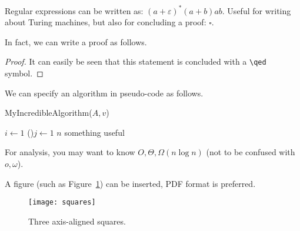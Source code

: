 \documentclass[
  course = {{IE579 Game Theory and Multi-Agent Reinforcement Learning}},
  assignment = 1,
  name = {{Mohammad Mahdi Rahimi}},
  studentnumber = {{20208244}},
  email = {{mahi@kaist.ac.kr}},
  firstexercise = 1
]{aga-homework}
\begin{document}
\exercise

\subexercise Regular expressions can be written as: $(a + \varepsilon)^* (a+b) ab$.
\subexercise Useful for writing about Turing machines, but also for concluding a proof: $\square$.

In fact, we can write a proof as follows.

\begin{proof}
  It can easily be seen that this statement is concluded with a \texttt{\textbackslash{}qed} symbol.
\end{proof}


\exercise

We can specify an algorithm in pseudo-code as follows.

\begin{algorithm}[H]
  \caption{MyIncredibleAlgorithm($A, v$)}

  $i \leftarrow 1$ \;
  \For(){$j \leftarrow 1$ \To $n$}{
    something useful 
  }
\end{algorithm}

\noindent For analysis, you may want to know $O, \Theta, \Omega(n \log n)$ (not to be confused with $o, \omega$).


\exercise

A figure (such as Figure~\ref{fig:squares}) can be inserted, PDF format is preferred.

\begin{figure}[b] %
  \begin{center}
    \texttt{[image: squares]}
    \caption{Three axis-aligned squares.}
    \label{fig:squares}
  \end{center}
\end{figure}
\end{document}
